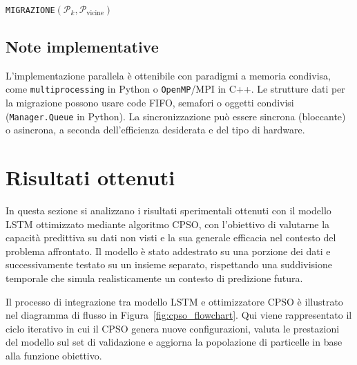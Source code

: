 \documentclass{article}
\begin{document}
\begin{algorithm}[H]
\caption{\texttt{MIGRAZIONE}$(\mathcal{P}_k, \mathcal{P}_{\text{vicine}})$}
\end{algorithm}

\subsection{Note implementative}

L'implementazione parallela è ottenibile con paradigmi a memoria condivisa, come 
\texttt{multiprocessing} in Python o \texttt{OpenMP}/MPI in C++. Le strutture dati per la migrazione 
possono usare code FIFO, semafori o oggetti condivisi (\texttt{Manager.Queue} in Python). 
La sincronizzazione può essere sincrona (bloccante) o asincrona, a seconda dell’efficienza desiderata e 
del tipo di hardware.

\section{Risultati ottenuti}

In questa sezione si analizzano i risultati sperimentali ottenuti con il modello LSTM ottimizzato 
mediante algoritmo CPSO, con l’obiettivo di valutarne la capacità predittiva su dati non visti e la sua 
generale efficacia nel contesto del problema affrontato. Il modello è stato addestrato su una porzione 
dei dati e successivamente testato su un insieme separato, rispettando una suddivisione temporale che 
simula realisticamente un contesto di predizione futura.

Il processo di integrazione tra modello LSTM e ottimizzatore CPSO è illustrato nel diagramma di flusso 
in Figura~\ref{fig:cpso_flowchart}. Qui viene rappresentato il ciclo iterativo in cui il CPSO genera 
nuove configurazioni, valuta le prestazioni del modello sul set di validazione e aggiorna la popolazione 
di particelle in base alla funzione obiettivo.
\end{document}
